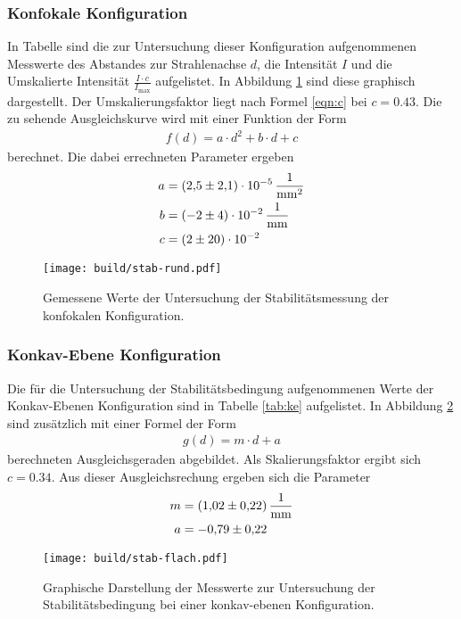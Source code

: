\newpage
\subsubsection{Konfokale Konfiguration}
In Tabelle  sind die zur Untersuchung dieser Konfiguration
aufgenommenen Messwerte des Abstandes zur Strahlenachse $d$, die Intensität $I$
und die Umskalierte Intensität $\frac{I \cdot c}{I_\text{max}}$ aufgelistet. In
Abbildung \ref{plt:kk} sind diese
graphisch dargestellt. Der Umskalierungsfaktor liegt nach Formel \ref{eqn:c} bei
$c = \num{0,43}$. Die zu sehende Ausgleichskurve wird mit einer Funktion der Form
\begin{align*}
  f(d) = a\cdot d^2 + b\cdot d + c
\end{align*}
berechnet. Die dabei errechneten Parameter ergeben
\begin{align*}
  a &= \SI{2.5(21)e-5}{\raiseto{-2}\milli\meter} \\
  b &= \SI{-2(4)e-2}{\raiseto{-1}\milli\meter} \\
  c &= \num{2(20)e-2}
\end{align*}

\begin{figure}[htb]
  \centering
  \texttt{[image: build/stab-rund.pdf]}
  \caption{Gemessene Werte der Untersuchung der Stabilitätsmessung der konfokalen Konfiguration. }
  \label{plt:kk}
\end{figure}


\FloatBarrier

\subsubsection{Konkav-Ebene Konfiguration}
Die für die Untersuchung der Stabilitätsbedingung aufgenommenen Werte der
Konkav-Ebenen Konfiguration sind in Tabelle \ref{tab:ke} aufgelistet.
In Abbildung \ref{plt:ke} sind zusätzlich mit einer Formel der Form
\begin{align*}
  g(d) = m\cdot d + a
\end{align*}
berechneten Ausgleichsgeraden abgebildet. Als Skalierungsfaktor ergibt
sich $c = \num{0.34}$. Aus dieser Ausgleichsrechung ergeben sich die Parameter
\begin{align*}
   m &= \SI{1.02(22)}{\raiseto{-1}\milli\meter} \\
   a &= \num{-0.79(22)}
\end{align*}

\begin{figure}[htb]
  \centering
  \texttt{[image: build/stab-flach.pdf]}
  \caption{Graphische Darstellung der Messwerte zur Untersuchung der Stabilitätsbedingung bei einer konkav-ebenen Konfiguration.}
  \label{plt:ke}
\end{figure}


\FloatBarrier
